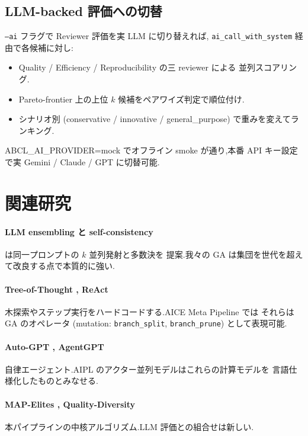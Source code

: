 \documentclass[11pt,a4paper]{article}
\newcommand{\code}[1]{\texttt{\small #1}}
\begin{document}
\subsection{LLM-backed 評価への切替}

\code{--ai} フラグで Reviewer 評価を実 LLM に切り替えれば,
\code{ai\_call\_with\_system} 経由で各候補に対し:

\begin{itemize}[leftmargin=*,itemsep=0pt]
  \item Quality / Efficiency / Reproducibility の三 reviewer による
    並列スコアリング.
  \item Pareto-frontier 上の上位 $k$ 候補をペアワイズ判定で順位付け.
  \item シナリオ別 (conservative / innovative / general\_purpose)
    で重みを変えてランキング.
\end{itemize}

ABCL\_AI\_PROVIDER=mock でオフライン smoke が通り,本番 API
キー設定で実 Gemini / Claude / GPT に切替可能.

\section{関連研究}
\label{sec:related}

\paragraph{LLM ensembling と self-consistency}
\cite{wang2022selfconsistency} は同一プロンプトの $k$ 並列発射と多数決を
提案.我々の GA は集団を世代を超えて改良する点で本質的に強い.

\paragraph{Tree-of-Thought \cite{yao2023tot}, ReAct \cite{yao2022react}}
木探索やステップ実行をハードコードする.AICE Meta Pipeline では
それらは GA のオペレータ (mutation: \code{branch\_split},
\code{branch\_prune}) として表現可能.

\paragraph{Auto-GPT \cite{autogpt2023}, AgentGPT}
自律エージェント.AIPL のアクター並列モデルはこれらの計算モデルを
言語仕様化したものとみなせる.

\paragraph{MAP-Elites \cite{mouret2015mapelites}, Quality-Diversity}
本パイプラインの中核アルゴリズム.LLM 評価との組合せは新しい.
\end{document}
